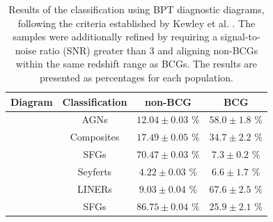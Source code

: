 \begin{table}[htb]
  \centering
  \begin{tabular}{cccc}
    \hline\hline
    \multicolumn{1}{c}{Diagram} & Classification & non-BCG & BCG \\
    \hline
    [NII]  & AGNs & $12.04 \pm 0.03$ $\%$ & $58.0 \pm 1.8$ $\%$ \\
           & Composites & $17.49 \pm 0.05$ $\%$ &  $34.7 \pm 2.2$ $\%$ \\
           & SFGs & $70.47 \pm 0.03$ $\%$ &  $7.3 \pm 0.2$ $\%$ \\ 
    \hline
    [SII]  & Seyferts & $4.22 \pm 0.03$ $\%$  & $6.6 \pm 1.7$ $\%$\\
           & LINERs & $9.03 \pm 0.04$ $\%$  & $67.6 \pm 2.5$ $\%$\\
           & SFGs &$86.75 \pm 0.04$ $\%$  & $25.9 \pm 2.1$ $\%$\\
    \hline\hline
  \end{tabular}
  \caption{Results of the classification using BPT diagnostic diagrams, following the criteria established by Kewley et al. \cite{2006MNRAS.372..961K}. The samples were additionally refined by requiring a signal-to-noise ratio (SNR) greater than 3 and aligning non-BCGs within the same redshift range as BCGs. The results are presented as percentages for each population. }
  \label{tab:Optical2}
\end{table}

